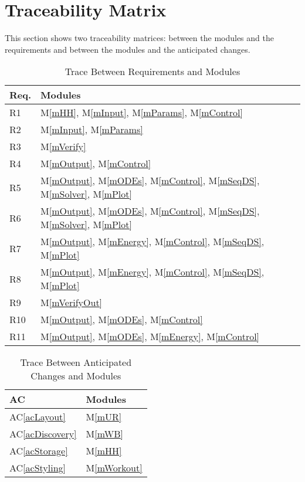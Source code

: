 \documentclass[12pt, titlepage]{article}
\newcommand{\acref}[1]{AC\ref{#1}}
\newcommand{\mref}[1]{M\ref{#1}}
\begin{document}
\section{Traceability Matrix} \label{SecTM}

This section shows two traceability matrices: between the modules and the
requirements and between the modules and the anticipated changes.

\begin{table}[H]
\centering
\begin{tabular}{p{} p{}}
\toprule
\textbf{Req.} & \textbf{Modules}\\
\midrule
R1 & \mref{mHH}, \mref{mInput}, \mref{mParams}, \mref{mControl}\\
R2 & \mref{mInput}, \mref{mParams}\\
R3 & \mref{mVerify}\\
R4 & \mref{mOutput}, \mref{mControl}\\
R5 & \mref{mOutput}, \mref{mODEs}, \mref{mControl}, \mref{mSeqDS}, \mref{mSolver}, \mref{mPlot}\\
R6 & \mref{mOutput}, \mref{mODEs}, \mref{mControl}, \mref{mSeqDS}, \mref{mSolver}, \mref{mPlot}\\
R7 & \mref{mOutput}, \mref{mEnergy}, \mref{mControl}, \mref{mSeqDS}, \mref{mPlot}\\
R8 & \mref{mOutput}, \mref{mEnergy}, \mref{mControl}, \mref{mSeqDS}, \mref{mPlot}\\
R9 & \mref{mVerifyOut}\\
R10 & \mref{mOutput}, \mref{mODEs}, \mref{mControl}\\
R11 & \mref{mOutput}, \mref{mODEs}, \mref{mEnergy}, \mref{mControl}\\
\bottomrule
\end{tabular}
\caption{Trace Between Requirements and Modules}
\label{TblRT}
\end{table}

\begin{table}[H]
\centering
\begin{tabular}{p{} p{}}
\toprule
\textbf{AC} & \textbf{Modules}\\
\midrule
\acref{acLayout} & \mref{mUR}\\
\acref{acDiscovery} & \mref{mWB}\\
\acref{acStorage} & \mref{mHH}\\
\acref{acStyling} & \mref{mWorkout}\\
\bottomrule
\end{tabular}
\caption{Trace Between Anticipated Changes and Modules}
\label{TblACT}
\end{table}
\end{document}
